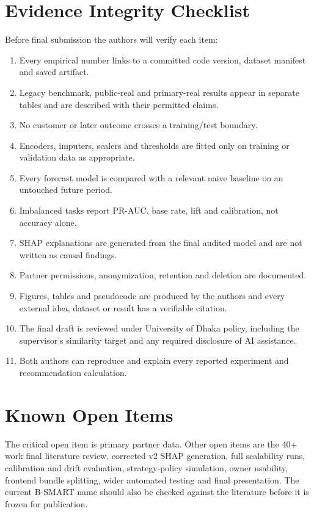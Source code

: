 \section{Evidence Integrity Checklist}

Before final submission the authors will verify each item:

\begin{enumerate}[label=\arabic*.]
  \item Every empirical number links to a committed code version, dataset
  manifest and saved artifact.
  \item Legacy benchmark, public-real and primary-real results appear in separate
  tables and are described with their permitted claims.
  \item No customer or later outcome crosses a training/test boundary.
  \item Encoders, imputers, scalers and thresholds are fitted only on training
  or validation data as appropriate.
  \item Every forecast model is compared with a relevant naive baseline on an
  untouched future period.
  \item Imbalanced tasks report PR-AUC, base rate, lift and calibration, not
  accuracy alone.
  \item SHAP explanations are generated from the final audited model and are not
  written as causal findings.
  \item Partner permissions, anonymization, retention and deletion are documented.
  \item Figures, tables and pseudocode are produced by the authors and every
  external idea, dataset or result has a verifiable citation.
  \item The final draft is reviewed under University of Dhaka policy, including
  the supervisor's similarity target and any required disclosure of AI assistance.
  \item Both authors can reproduce and explain every reported experiment and
  recommendation calculation.
\end{enumerate}

\section{Known Open Items}

The critical open item is primary partner data. Other open items are the 40+ work
final literature review, corrected v2 SHAP generation, full scalability runs,
calibration and drift evaluation, strategy-policy simulation, owner usability,
frontend bundle splitting, wider automated testing and final presentation. The
current B-SMART name should also be checked against the literature before it is
frozen for publication.
